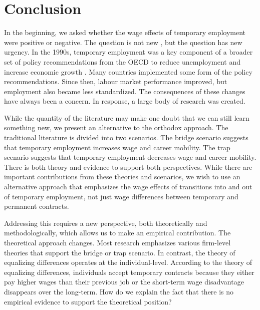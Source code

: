 \documentclass[12pt]{article}
\begin{document}
\section{Conclusion}

In the beginning, we asked whether the wage effects of temporary employment were positive or negative.  The question is not new  \citep{kalleberg_nonstandard_2000}, but the question has new urgency.  In the 1990s, temporary employment was a key component of a broader set of policy recommendations from the OECD to reduce unemployment and increase economic growth \citep{oecd_oecd_1996}.  Many countries implemented some form of the policy recommendations. Since then, labour market performance improved, but employment also became less standardized. The consequences of these changes have always been a concern. In response, a large body of research was created.  

While the quantity of the literature may make one doubt that we can still learn something new, we present an alternative to the orthodox approach.  The traditional literature is divided into two scenarios.  The bridge scenario suggests that temporary employment increases wage and career mobility.  The trap scenario suggests that temporary employment decreases wage and career mobility.  There is both theory and evidence to support both perspectives.  While there are important contributions from these theories and scenarios, we wish to use an alternative approach that emphasizes the wage effects of transitions into and out of temporary employment, not just wage differences between temporary and permanent contracts.

Addressing this requires a new perspective, both theoretically and methodologically, which allows us to make an empirical contribution.  The theoretical approach changes.  Most research emphasizes various firm-level theories that support the bridge or trap scenario.  In contrast, the theory of equalizing differences operates at the individual-level.  According to the theory of equalizing differences, individuals accept temporary contracts because they either pay higher wages than their previous job or the short-term wage disadvantage disappears over the long-term.  How do we explain the fact that there is no empirical evidence to support the theoretical position?  
\end{document}
